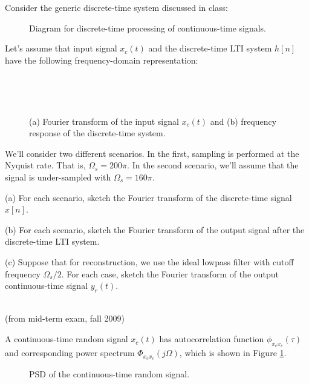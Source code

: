 \documentclass[12pt]{report}
\begin{document}

Consider the generic discrete-time system discussed in class:

\begin{figure}[!h]
	\centering
	\resizebox{0.9\textwidth}{!}{}
	\caption{Diagram for discrete-time processing of continuous-time signals.}
\end{figure}

Let's assume that input signal $x_c(t)$ and the discrete-time LTI system $h[n]$ have the following frequency-domain representation:

\begin{figure}[h]
	\begin{subfigure}[t]{0.5\textwidth}
		\centering
		\resizebox{\textwidth}{!}{}
		\caption{~}
	\end{subfigure}%
	\begin{subfigure}[t]{0.5\textwidth}
		\centering
		\resizebox{\textwidth}{!}{}
		\caption{~}
	\end{subfigure}
	\caption{(a) Fourier transform of the input signal $x_c(t)$ and (b) frequency response of the discrete-time system.}
\end{figure}

We'll consider two different scenarios. In the first, sampling is performed at the Nyquist rate. That is, $\Omega_s = 200\pi$. In the second scenario, we'll assume that the signal is under-sampled with $\Omega_s = 160\pi$.

\begin{description}
	\item{(a)} For each scenario, sketch the Fourier transform of the discrete-time signal $x[n]$.
	\item{(b)} For each scenario, sketch the Fourier transform of the output signal after the discrete-time LTI system.
	\item{(c)} Suppose that for reconstruction, we use the ideal lowpass filter with cutoff frequency $\Omega_s/2$. For each case, sketch the Fourier transform of the output continuous-time signal $y_r(t)$.
\end{description}
\mbox{}\\

  (from mid-term exam, fall 2009)

A continuous-time random signal $x_c(t)$ has autocorrelation function
$\phi_{x_c x_c}(\tau)$ and corresponding power spectrum $\Phi_{x_cx_c}(j\Omega)$, which is shown in Figure \ref{fig:CTspectrum}.
\begin{figure}[h]
	\centering
	
	\caption{PSD of the continuous-time random signal.\label{fig:CTspectrum}}
\end{figure}
\end{document}
